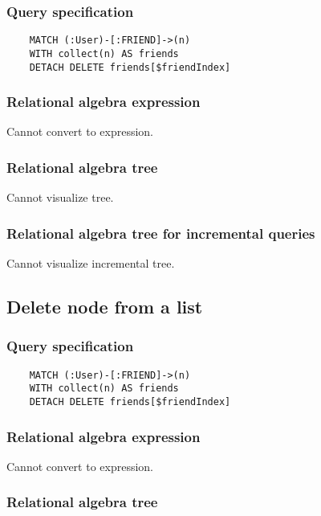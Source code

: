 	\subsubsection*{Query specification}

	\begin{lstlisting}
	MATCH (:User)-[:FRIEND]->(n)
	WITH collect(n) AS friends
	DETACH DELETE friends[$friendIndex]
	\end{lstlisting}


	\subsubsection*{Relational algebra expression}

	Cannot convert to expression.

	\subsubsection*{Relational algebra tree}

	Cannot visualize tree.

	\subsubsection*{Relational algebra tree for incremental queries}

	Cannot visualize incremental tree.
	\subsection{Delete node from a list}

	\subsubsection*{Query specification}

	\begin{lstlisting}
	MATCH (:User)-[:FRIEND]->(n)
	WITH collect(n) AS friends
	DETACH DELETE friends[$friendIndex]
	\end{lstlisting}


	\subsubsection*{Relational algebra expression}

	Cannot convert to expression.

	\subsubsection*{Relational algebra tree}

